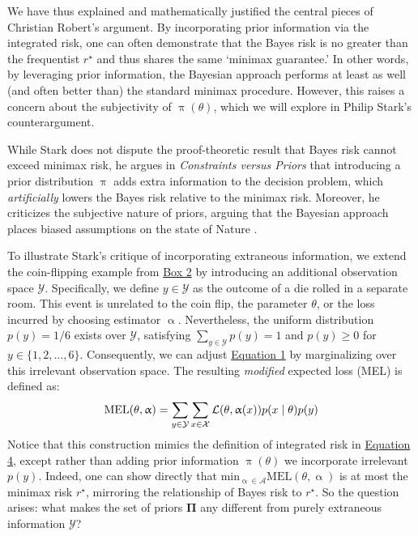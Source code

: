 \documentclass[letterpaper,12pt]{article}
\begin{document}
We have thus explained and mathematically justified the central pieces of Christian Robert’s argument. By incorporating prior information via the integrated risk, one can often demonstrate that the Bayes risk is no greater than the frequentist $r^{\star}$ and thus shares the same `minimax guarantee.' In other words, by leveraging prior information, the Bayesian approach performs at least as well (and often better than) the standard minimax procedure. However, this raises a concern about the subjectivity of $\uppi(\theta)$, which we will explore in Philip Stark's counterargument.

While Stark does not dispute the proof-theoretic result that Bayes risk cannot exceed minimax risk, he argues in \textit{Constraints versus Priors} that introducing a prior distribution $\uppi$ adds extra information to the decision problem, which \textit{artificially} lowers the Bayes risk relative to the minimax risk. Moreover, he criticizes the subjective nature of priors, arguing that the Bayesian approach places biased assumptions on the state of Nature \cite{stark2020constraints}. 

To illustrate Stark’s critique of incorporating extraneous information, we extend the coin-flipping example from \hyperref[ex:1]{Box 2} by introducing an additional observation space $\mathcal{Y}$. Specifically, we define $y \in \mathcal{Y}$ as the outcome of a die rolled in a separate room. This event is unrelated to the coin flip, the parameter $\theta$, or the loss incurred by choosing estimator $\upalpha$. Nevertheless, the uniform distribution $p(y)=1/6$ exists over $\mathcal{Y}$, satisfying $\sum_{y \in \mathcal{Y}}p(y) = 1$ and $p(y) \geq 0$ for $y \in\{1,2, \dots, 6\}$. Consequently, we can adjust \hyperref[eq:EL]{Equation 1} by marginalizing over this irrelevant observation space. The resulting {\textit{modified}} expected loss (MEL) is defined as: \vspace{-0.5cm}
$$
\text{MEL}(\theta, \upalpha) = \sum_{y \in \mathcal{Y}}\sum_{x \in \mathcal{X}} \mathcal{L}(\theta, \upalpha(x))p(x \mid \theta)p(y) \label{eq:MEL} \vspace{-0.25cm}
$$
Notice that this construction mimics the definition of integrated risk in \hyperref[eq:IR]{Equation 4}, except rather than adding prior information $\uppi(\theta)$ we incorporate irrelevant $p(y)$. Indeed, one can show directly that $\text{min}_{\upalpha \in \mathcal{A}} \text{MEL}(\theta, \upalpha)$ is at most the minimax risk $r^{\star}$, mirroring the relationship of Bayes risk to $r^{\star}$. So the question arises: what makes the set of priors $\boldsymbol{\Pi}$ any different from purely extraneous information $\mathcal{Y}$?
\end{document}
